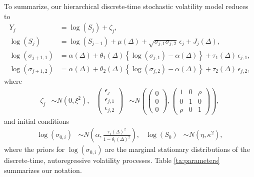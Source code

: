 To summarize, our hierarchical discrete-time stochastic volatility model reduces to
\begin{align}
  Y_j &= \log(S_j) + \zeta_j  ,   \label{eq:mod1}   \\
  \log(S_{j}) &= \log(S_{j-1}) + \mu(\Delta) + \sqrt{\sigma_{j,1}\sigma_{j,2}} \, \epsilon_{j} + J_j(\Delta)   ,  \label{eq:mod2}  \\
  \log(\sigma_{j+1,1}) &= \alpha(\Delta) + \theta_1(\Delta) \left\{ \log(\sigma_{j,1}) - \alpha(\Delta) \right\} + \tau_1(\Delta) \, \epsilon_{j,1}    ,  \label{eq:mod3}  \\
  \log(\sigma_{j+1,2}) &= \alpha(\Delta) + \theta_2(\Delta) \left\{ \log(\sigma_{j,2}) - \alpha(\Delta) \right\} + \tau_2(\Delta) \, \epsilon_{j,2}    , \label{eq:mod4}
\end{align}
where
\begin{align*}
  \zeta_j &\sim N(0, \xi^2)  ,  &
                                  \left( \begin{matrix} \epsilon_{j} \\
      \epsilon_{j,1} \\ \epsilon_{j,2} \end{matrix} \right) &\sim
                                            N \left( \left(\begin{matrix} 0 \\ 0 \\
	                                          0 \end{matrix}
                                              \right) ,
  \left( \begin{matrix} 1 & 0 & \rho \\
      0 & 1 & 0 \\
    \rho & 0 & 1 \end{matrix} \right) \right)  ,
\end{align*}
and initial conditions
\begin{align*}
  \log(\sigma_{0,i}) & \sim N \left( \alpha , \frac{\tau_i(\Delta)^2}{1 - \theta_i(\Delta)^2} \right)  ,  &   \log(S_0) & \sim N \left( \eta, \kappa^2 \right)  ,
\end{align*}
where the priors for $\log(\sigma_{0,i})$ are the marginal stationary
distributions of the discrete-time, autoregressive volatility
processes. Table \ref{ta:parameters} summarizes our notation.
%
